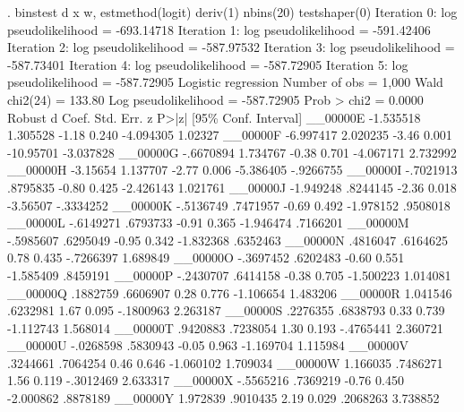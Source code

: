 . binstest d x w, estmethod(logit) deriv(1) nbins(20) testshaper(0)
{\smallskip}
Iteration 0:   log pseudolikelihood = -693.14718  
Iteration 1:   log pseudolikelihood = -591.42406  
Iteration 2:   log pseudolikelihood = -587.97532  
Iteration 3:   log pseudolikelihood = -587.73401  
Iteration 4:   log pseudolikelihood = -587.72905  
Iteration 5:   log pseudolikelihood = -587.72905  
{\smallskip}
Logistic regression                             Number of obs     =      1,000
                                                Wald chi2(24)     =     133.80
Log pseudolikelihood = -587.72905               Prob > chi2       =     0.0000
{\smallskip}
             {\VBAR}               Robust
           d {\VBAR}      Coef.   Std. Err.      z    P>|z|     [95\% Conf. Interval]
    __00000E {\VBAR}  -1.535518   1.305528    -1.18   0.240    -4.094305     1.02327
    __00000F {\VBAR}  -6.997417   2.020235    -3.46   0.001    -10.95701   -3.037828
    __00000G {\VBAR}  -.6670894   1.734767    -0.38   0.701    -4.067171    2.732992
    __00000H {\VBAR}   -3.15654   1.137707    -2.77   0.006    -5.386405   -.9266755
    __00000I {\VBAR}  -.7021913   .8795835    -0.80   0.425    -2.426143    1.021761
    __00000J {\VBAR}  -1.949248   .8244145    -2.36   0.018     -3.56507   -.3334252
    __00000K {\VBAR}  -.5136749   .7471957    -0.69   0.492    -1.978152    .9508018
    __00000L {\VBAR}  -.6149271   .6793733    -0.91   0.365    -1.946474    .7166201
    __00000M {\VBAR}  -.5985607   .6295049    -0.95   0.342    -1.832368    .6352463
    __00000N {\VBAR}   .4816047   .6164625     0.78   0.435    -.7266397    1.689849
    __00000O {\VBAR}  -.3697452   .6202483    -0.60   0.551    -1.585409    .8459191
    __00000P {\VBAR}  -.2430707   .6414158    -0.38   0.705    -1.500223    1.014081
    __00000Q {\VBAR}   .1882759   .6606907     0.28   0.776    -1.106654    1.483206
    __00000R {\VBAR}   1.041546   .6232981     1.67   0.095    -.1800963    2.263187
    __00000S {\VBAR}   .2276355   .6838793     0.33   0.739    -1.112743    1.568014
    __00000T {\VBAR}   .9420883   .7238054     1.30   0.193    -.4765441    2.360721
    __00000U {\VBAR}  -.0268598   .5830943    -0.05   0.963    -1.169704    1.115984
    __00000V {\VBAR}   .3244661   .7064254     0.46   0.646    -1.060102    1.709034
    __00000W {\VBAR}   1.166035   .7486271     1.56   0.119    -.3012469    2.633317
    __00000X {\VBAR}  -.5565216   .7369219    -0.76   0.450    -2.000862    .8878189
    __00000Y {\VBAR}   1.972839   .9010435     2.19   0.029     .2068263    3.738852
